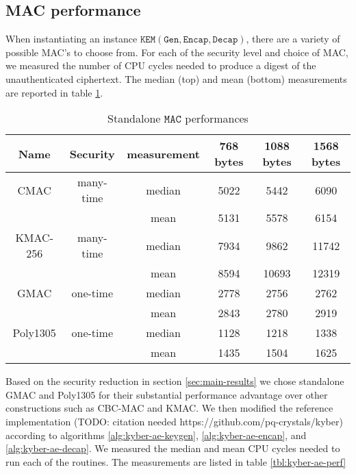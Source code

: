\documentclass[floatrow,journal=tches,submission]{iacrtrans}
\newcommand{\keygen}{\texttt{Gen}}
\newcommand{\kem}{\texttt{KEM}}
\newcommand{\encap}{\texttt{Encap}}
\newcommand{\decap}{\texttt{Decap}}
\newcommand{\mac}{\texttt{MAC}}
\begin{document}
% 

\subsection{MAC performance}\label{sec:mac-performance}
When instantiating an instance $\kem(\keygen, \encap, \decap)$, there are a variety of possible MAC's to choose from. For each of the security level and choice of MAC, we measured the number of CPU cycles needed to produce a digest of the unauthenticated ciphertext. The median (top) and mean (bottom) measurements are reported in table \ref{tbl:standalone-mac-perf}.

\begin{table}[H]
    \centering
    \begin{tabular}{|c|c|c|c|c|c|}
        \hline
        Name & Security & measurement & 768 bytes & 1088 bytes & 1568 bytes \\
        \hline
        CMAC & many-time & median & 5022 & 5442 & 6090 \\
        & & mean & 5131 & 5578 & 6154 \\
        \hline
        KMAC-256 & many-time & median & 7934 & 9862 & 11742 \\
        & & mean & 8594 & 10693 & 12319 \\
        \hline
        GMAC & one-time & median & 2778 & 2756 & 2762 \\
        & & mean & 2843 & 2780 & 2919 \\
        \hline
        Poly1305 & one-time & median & 1128 & 1218 & 1338 \\
        & & mean & 1435 & 1504 & 1625 \\
        \hline
    \end{tabular}
    \caption{Standalone $\mac$ performances}\label{tbl:standalone-mac-perf}
\end{table}

Based on the security reduction in section \ref{sec:main-results} we chose standalone GMAC and Poly1305 for their substantial performance advantage over other constructions such as CBC-MAC and KMAC. We then modified the reference implementation (TODO: citation needed https://github.com/pq-crystals/kyber) according to algorithms \ref{alg:kyber-ae-keygen}, \ref{alg:kyber-ae-encap}, and \ref{alg:kyber-ae-decap}. We measured the median and mean CPU cycles needed to run each of the routines. The measurements are listed in table \ref{tbl:kyber-ae-perf}
\end{document}
